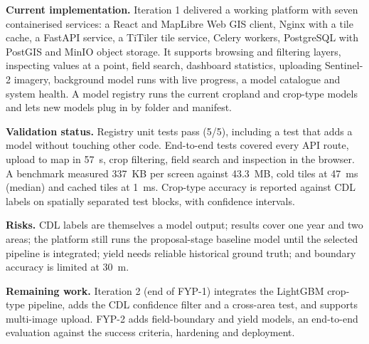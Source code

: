 \textbf{Current implementation.} Iteration 1 delivered a working platform with seven containerised
services: a React and MapLibre Web GIS client, Nginx with a tile cache, a FastAPI service, a
TiTiler tile service, Celery workers, PostgreSQL with PostGIS and MinIO object storage. It supports
browsing and filtering layers, inspecting values at a point, field search, dashboard statistics,
uploading Sentinel-2 imagery, background model runs with live progress, a model catalogue and
system health. A model registry runs the current cropland and crop-type models and lets new models
plug in by folder and manifest.

\textbf{Validation status.} Registry unit tests pass (5/5), including a test that adds a model
without touching other code. End-to-end tests covered every API route, upload to map in 57~s,
crop filtering, field search and inspection in the browser. A benchmark measured 337~KB per screen
against 43.3~MB, cold tiles at 47~ms (median) and cached tiles at 1~ms. Crop-type accuracy is
reported against CDL labels on spatially separated test blocks, with confidence intervals.

\textbf{Risks.} CDL labels are themselves a model output; results cover one year and two areas; the
platform still runs the proposal-stage baseline model until the selected pipeline is integrated;
yield needs reliable historical ground truth; and boundary accuracy is limited at 30~m.

\textbf{Remaining work.} Iteration 2 (end of FYP-1) integrates the LightGBM crop-type pipeline,
adds the CDL confidence filter and a cross-area test, and supports multi-image upload. FYP-2 adds
field-boundary and yield models, an end-to-end evaluation against the success criteria, hardening
and deployment.

